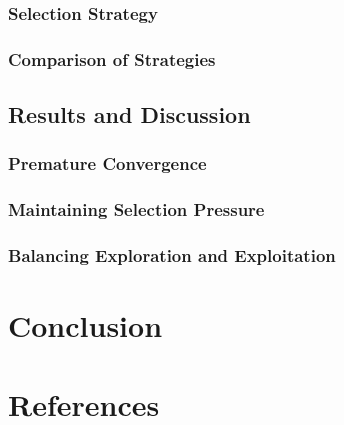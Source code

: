 \documentclass[conference]{inc/IEEEtran}
\begin{document}
\subsubsection{Selection Strategy}

\subsubsection{Comparison of Strategies}
\subsection{Results and Discussion}

\subsubsection{Premature Convergence}

\subsubsection{Maintaining Selection Pressure}

\subsubsection{Balancing Exploration and Exploitation}

\section{Conclusion}

\section*{References}




\end{document}
